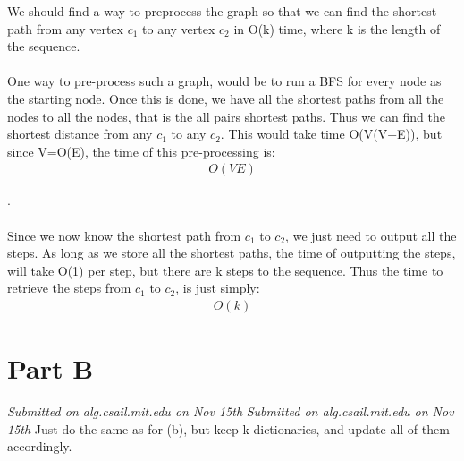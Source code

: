 \documentclass[12pt,twoside]{article}
\begin{document}
\begin{problems}
\begin{problemparts}
\problempart 

We should find a way to preprocess the graph so that we can find the shortest path from any vertex $c_1$ to any vertex $c_2$ in O(k) time, where k is the length of the sequence.
\\\\
One way to pre-process such a graph, would be to run a BFS for every node as the starting node. Once this is done, we have all the shortest paths from all the nodes to all the nodes, that is the all pairs shortest paths. Thus we can find the shortest distance from any $c_1$ to any $c_2$. This would take time O(V(V+E)), but since V=O(E), the time of this pre-processing is:
 \begin{align*}
 O(VE)
 \end{align*}

 .
\\\\
 Since we now know the shortest path from $c_1$ to $c_2$, we just need to output all the steps. As long as we store all the shortest paths, the time of outputting the steps, will take O(1) per step, but there are k steps to the sequence. Thus the time to retrieve the steps from $c_1$ to $c_2$, is just simply:
 \begin{align*}
 O(k)
 \end{align*}

\end{problemparts}

\section*{Part B}

\problem
\begin{problemparts}
\problempart \emph{Submitted on alg.csail.mit.edu on Nov 15th}
\problempart \emph{Submitted on alg.csail.mit.edu on Nov 15th}
\problempart
Just do the same as for (b), but keep k dictionaries, and update all of them accordingly.
\end{problemparts}

\end{problems}
\end{document}
